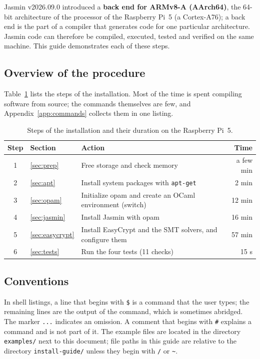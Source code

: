 \documentclass[11pt,a4paper]{article}
\newcommand{\file}[1]{\texttt{#1}}
\begin{document}
Jasmin v2026.09.0 introduced a \textbf{back end for ARMv8-A (AArch64)},
the 64-bit architecture of the processor of the Raspberry Pi~5 (a
Cortex-A76); a back end is the part of a compiler that generates code for
one particular architecture. Jasmin code can therefore be compiled,
executed, tested and verified on the same machine. This guide demonstrates each of these steps.

\subsection{Overview of the procedure}

Table~\ref{tab:roadmap} lists the steps of the installation. Most of the
time is spent compiling software from source; the commands themselves are
few, and Appendix~\ref{app:commands} collects them in one listing.

\begin{table}[h]
\centering\small
\begin{tabularx}{\textwidth}{@{}clXr@{}}
\toprule
\textbf{Step} & \textbf{Section} & \textbf{Action} & \textbf{Time} \\
\midrule
1 & \ref{sec:prep} & Free storage and check memory & a few min \\
2 & \ref{sec:apt} & Install system packages with \texttt{apt-get} & 2 min \\
3 & \ref{sec:opam} & Initialize opam and create an OCaml environment (switch) & 12 min \\
4 & \ref{sec:jasmin} & Install Jasmin with opam & 16 min \\
5 & \ref{sec:easycrypt} & Install EasyCrypt and the SMT solvers, and configure them & 57 min \\
6 & \ref{sec:tests} & Run the four tests (11 checks) & 15 s \\
\bottomrule
\end{tabularx}
\caption{Steps of the installation and their duration on the Raspberry Pi~5.}
\label{tab:roadmap}
\end{table}

\subsection{Conventions}

In shell listings, a line that begins with \texttt{\$} is a command that the
user types; the remaining lines are the output of the command, which is
sometimes abridged. The marker \texttt{...} indicates an omission. A
comment that begins with \texttt{\#} explains a command and is not part of
it. The example files are located in the directory \file{examples/} next to
this document; file paths in this guide are relative to the directory
\file{install-guide/} unless they begin with \texttt{/} or
\texttt{\textasciitilde}.
\end{document}
